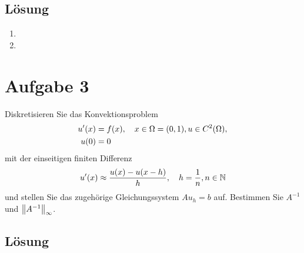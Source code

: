 \documentclass{exercise}
\begin{document}
    \subsection*{Lösung}
    \begin{enumerate}
        \item
        \item 
    \end{enumerate}


    \section*{Aufgabe 3}
    
    \begin{problem}
        Diskretisieren Sie das Konvektionsproblem
        \begin{align*}
            u'\parentheses*{x} &= f\parentheses*{x}, \quad x \in \Omega = \parentheses*{0, 1}, u \in C^2\parentheses*{\Omega},\\
            u\parentheses*{0} &= 0
        \end{align*}
        mit der einseitigen finiten Differenz
        \[
            u'\parentheses*{x} \approx \frac{u\parentheses*{x} - u\parentheses*{x - h}}{h}, \quad h = \frac{1}{n}, n \in \N
        \]
        und stellen Sie das zugehörige Gleichungssystem \(Au_h = b\) auf.
        Bestimmen Sie \(A^{-1}\) und \(\norm*{A^{-1}}_\infty\).
    \end{problem}
    
    \subsection*{Lösung}
\end{document}

